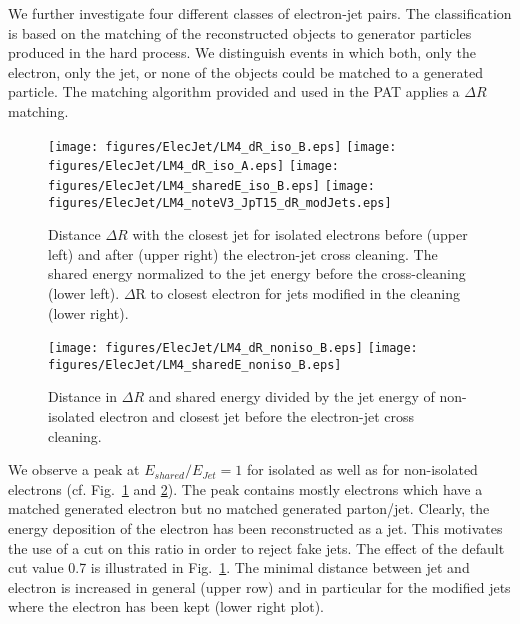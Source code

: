 \documentclass{cmspaper}
\begin{document}
We further investigate four different classes of electron-jet pairs. The
classification is based on the matching of the reconstructed objects
to generator particles produced in the hard process. We distinguish events in
which both, only the electron, only the jet, or none of the objects could be matched to a generated
particle. The matching algorithm provided and used in the PAT applies a $\Delta
R$ matching.

\begin{figure}[htbp]
\begin{center}
    \texttt{[image: figures/ElecJet/LM4\_dR\_iso\_B.eps]}
    \texttt{[image: figures/ElecJet/LM4\_dR\_iso\_A.eps]}
    \texttt{[image: figures/ElecJet/LM4\_sharedE\_iso\_B.eps]}
    \texttt{[image: figures/ElecJet/LM4\_noteV3\_JpT15\_dR\_modJets.eps]}
    \caption{Distance \(\Delta R\)  with the closest jet for isolated electrons
before (upper left) and after (upper right) the electron-jet cross cleaning. 
The shared energy normalized to the jet energy before the cross-cleaning (lower left). 
$\Delta$R to closest electron for jets modified in the cleaning (lower right).}
\label{fig:dR_sE_ElecJet_iso}
\end{center}
\end{figure}

\begin{figure}[htbp]
\begin{center}
    \texttt{[image: figures/ElecJet/LM4\_dR\_noniso\_B.eps]}
    \texttt{[image: figures/ElecJet/LM4\_sharedE\_noniso\_B.eps]}
    \caption{Distance in $\Delta R$ and shared energy divided by the jet energy
    of non-isolated electron and closest jet before the electron-jet cross cleaning.}
\label{fig:dR_sE_ElecJet_noniso}
\end{center}
\end{figure}

We observe a peak at $E_{shared}/E_{Jet}=1$ for isolated as well as for
non-isolated electrons (cf. Fig.~\ref{fig:dR_sE_ElecJet_iso} and
\ref{fig:dR_sE_ElecJet_noniso}). The peak contains mostly electrons which have a
matched generated electron but no matched generated parton/jet. Clearly, the
energy deposition of the electron has been reconstructed as a jet. This
motivates the use of a cut on this ratio in order to reject fake jets.  The
effect of the default cut value 0.7 is illustrated in Fig.~\ref{fig:dR_sE_ElecJet_iso}.
The minimal distance between jet and electron is increased in general (upper
row) and in particular for the modified jets where the electron has been kept
(lower right plot).
\end{document}
